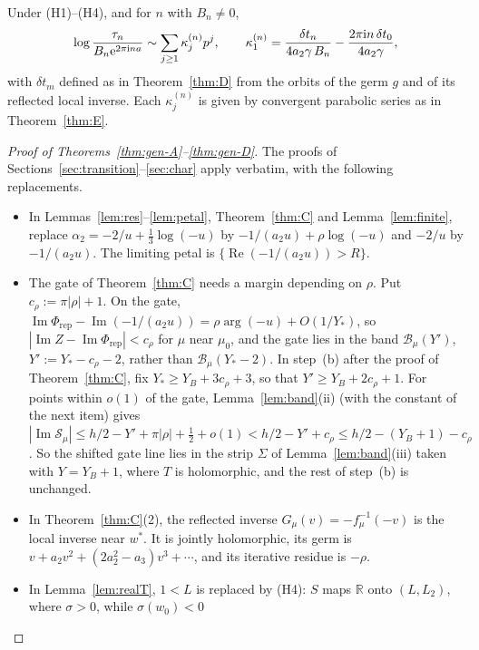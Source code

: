 \begin{theorem}\label{thm:gen-D}
Under \textup{(H1)--(H4)}, and for $n$ with $B_n\ne0$,
\[
 \log\frac{\tau_n}{B_n\mathrm{e}^{2\pi\mathrm{i} na}}\sim\sum_{j\ge1}\kappa^{(n)}_jp^j,\qquad
 \kappa^{(n)}_1=\frac{\delta t_n}{4a_2\gamma\,B_n}-\frac{2\pi\mathrm{i} n\,\delta t_0}{4a_2\gamma},
\]
with $\delta t_m$ defined as in Theorem~\ref{thm:D} from the orbits of the germ $g$
and of its reflected local inverse.  Each $\kappa^{(n)}_j$ is given by convergent
parabolic series as in Theorem~\ref{thm:E}.
\end{theorem}

\begin{proof}[Proof of Theorems~\ref{thm:gen-A}--\ref{thm:gen-D}]
The proofs of Sections~\ref{sec:transition}--\ref{sec:char} apply verbatim,
with the following replacements.
\begin{itemize}
\item In Lemmas~\ref{lem:res}--\ref{lem:petal}, Theorem~\ref{thm:C} and
  Lemma~\ref{lem:finite}, replace
  $\alpha_2=-2/u+\tfrac13\log(-u)$ by $-1/(a_2u)+\rho\log(-u)$ and $-2/u$ by
  $-1/(a_2u)$.  The limiting petal is $\{\operatorname{Re}(-1/(a_2u))>R\}$.
\item The gate of Theorem~\ref{thm:C} needs a margin depending on $\rho$.  Put
  $c_\rho:=\pi|\rho|+1$.  On the gate,
  $\operatorname{Im}\Phi_{\mathrm{rep}}-\operatorname{Im}(-1/(a_2u))
  =\rho\arg(-u)+O(1/Y_*)$, so $|\operatorname{Im}Z-\operatorname{Im}\Phi_{\mathrm{rep}}|<c_\rho$
  for $\mu$ near $\mu_0$, and the gate lies in the band
  $\mathcal B_\mu(Y')$, $Y':=Y_*-c_\rho-2$, rather than $\mathcal B_\mu(Y_*-2)$.
  In step~(b) after the proof of Theorem~\ref{thm:C}, fix
  $Y_*\ge Y_B+3c_\rho+3$, so that $Y'\ge Y_B+2c_\rho+1$.  For points within
  $o(1)$ of the gate, Lemma~\ref{lem:band}(ii) (with the constant of the next
  item) gives
  $|\operatorname{Im}\mathcal S_\mu|\le h/2-Y'+\pi|\rho|+\tfrac12+o(1)
  <h/2-Y'+c_\rho\le h/2-(Y_B+1)-c_\rho$.  So the shifted gate line lies in the
  strip $\Sigma$ of Lemma~\ref{lem:band}(iii) taken with $Y=Y_B+1$, where $T$ is
  holomorphic, and the rest of step~(b) is unchanged.
\item In Theorem~\ref{thm:C}(2), the reflected inverse
  $G_\mu(v)=-f_\mu^{-1}(-v)$ is the local inverse near $w^*$.  It is jointly
  holomorphic, its germ is $v+a_2v^2+(2a_2^2-a_3)v^3+\cdots$, and its iterative
  residue is $-\rho$.
\item In Lemma~\ref{lem:realT}, $1<L$ is replaced by \textup{(H4)}: $S$ maps
  $\mathbb R$ onto $(L,L_2)$, where $\sigma>0$, while $\sigma(w_0)<0$

\end{itemize}
\end{proof}

